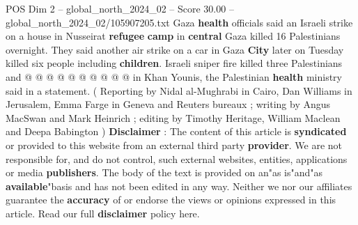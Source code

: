 \begin{textsample}{POS Dim 2 – global\_north\_2024\_02 – Score 30.00 – global\_north\_2024\_02/105907205.txt}
Gaza \textbf{health} officials said an Israeli strike on a house in Nusseirat \textbf{refugee} \textbf{camp} in \textbf{central} Gaza killed 16 Palestinians overnight.
They said another air strike on a car in Gaza \textbf{City} later on Tuesday killed six people including \textbf{children}.
Israeli sniper fire killed three Palestinians and @ @ @ @ @ @ @ @ @ @ in Khan Younis, the Palestinian \textbf{health} ministry said in a statement. ( Reporting by Nidal al-Mughrabi in Cairo, Dan Williams in Jerusalem, Emma Farge in Geneva and Reuters bureaux ; writing by Angus MacSwan and Mark Heinrich ; editing by Timothy Heritage, William Maclean and Deepa Babington ) \textbf{Disclaimer} : The content of this article is \textbf{syndicated} or provided to this website from an external third party \textbf{provider}.
We are not responsible for, and do not control, such external websites, entities, applications or media \textbf{publishers}.
The body of the text is provided on an"as is"and"as \textbf{available}"basis and has not been edited in any way.
Neither we nor our affiliates guarantee the \textbf{accuracy} of or endorse the views or opinions expressed in this article.
Read our full \textbf{disclaimer} policy here.

\end{textsample}

